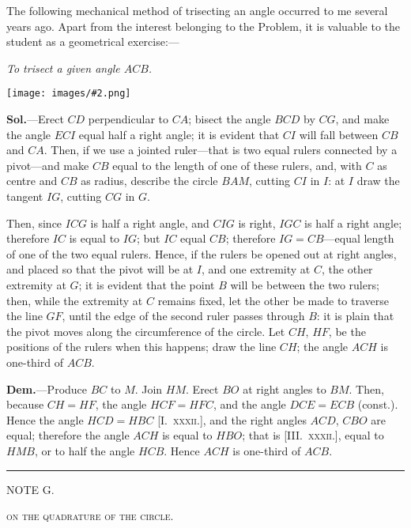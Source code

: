 \documentclass[oneside]{book}
\newcommand{\ibksp}{\hspace{-1.5em}}
\newcommand\imgcent[2]{
\begin{center}
\texttt{[image: images/\#2.png]}
\end{center}
}
\begin{document}
\begin{footnotesize}
The following mechanical method of trisecting an angle occurred
to me several years ago. Apart from the interest belonging
to the Problem, it is valuable to the student as a geometrical
exercise:---

\smallskip
\emph{To trisect a given angle $ACB$.}

\smallskip
\imgcent{204}{f254}

\textbf{Sol.}---Erect $CD$ perpendicular to $CA$; bisect the angle $BCD$
by $CG$, and make the angle $ECI$ equal half a right angle; it is
evident that $CI$ will fall between $CB$ and $CA$. Then, if we use a
jointed ruler---that is two equal rulers connected by a pivot---and
make $CB$ equal to the length of one of these rulers, and, with $C$
as centre and $CB$ as radius, describe the circle $BAM$, cutting
$CI$ in $I$: at $I$ draw the tangent $IG$, cutting $CG$ in $G$.

Then, since $ICG$ is half a right angle, and $CIG$ is right, $IGC$ is
half a right angle; therefore $IC$ is equal to $IG$; but $IC$ equal $CB$;
therefore $IG = CB$---equal length of one of the two equal rulers.
Hence, if the rulers be opened out at right angles, and placed
so that the pivot will be at $I$, and one extremity at $C$, the other
extremity at $G$; it is evident that the point $B$ will be between
the two rulers; then, while the extremity at $C$ remains fixed, let
the other be made to traverse the line $GF$, until the edge of the
second ruler passes through $B$: it is plain that the pivot moves
along the circumference of the circle. Let $CH$, $HF$, be the positions
of the rulers when this happens; draw the line $CH$; the
angle $ACH$ is one-third of $ACB$.

\textbf{Dem.}---Produce $BC$ to $M$. Join $HM$. Erect $BO$ at right
angles to $BM$. Then, because $CH=HF$, the angle $HCF = HFC$,
and the angle $DCE = ECB$ (const.). Hence the angle $HCD
= HBC$ [I.~\textsc{xxxii.}], and the right angles $ACD$, $CBO$ are equal;
therefore the angle $ACH$ is equal to $HBO$; that is [III\@.~\textsc{xxxii.}],
equal to $HMB$, or to half the angle $HCB$. Hence $ACH$ is one-third
of $ACB$.
\end{footnotesize}


\bigskip
\begin{center}
\rule[.5ex]{3cm}{1pt}

\bigskip
\addcontentsline{toc}{section}{\ibksp G.---On the quadrature of the circle,}
{\large NOTE G.}
\medskip

\textsc{on the quadrature of the circle.}
\end{center}
\end{document}
